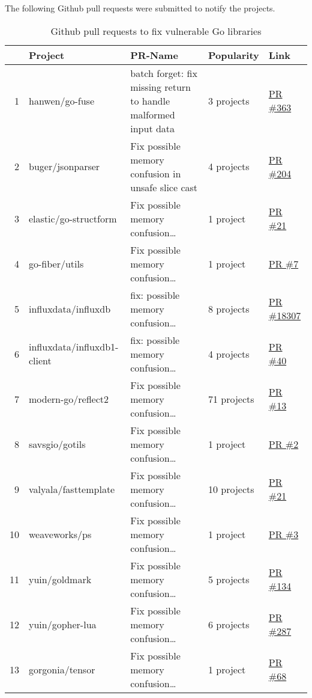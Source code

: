 The following Github pull requests were submitted to notify the projects.

\begin{table}[h]
    \centering
    \caption{Github pull requests to fix vulnerable Go libraries}
    \label{tbl:pull-requests}
    \begin{tabularx}{\textwidth}{rlXll}
        \toprule
        {} & Project & PR-Name & Popularity & Link \\
        \midrule
        1  & hanwen/go-fuse & batch forget: fix missing return to handle malformed input data & 3 projects & \href{https://www.github.com/hanwen/go-fuse/pull/363}{PR \#363} \\
        2  & buger/jsonparser & Fix possible memory confusion in unsafe slice cast & 4 projects & \href{https://www.github.com/buger/jsonparser/pull/204}{PR \#204} \\
        3  & elastic/go-structform & Fix possible memory confusion\ldots & 1 project & \href{https://github.com/elastic/go-structform/pull/21}{PR \#21} \\
        4  & go-fiber/utils & Fix possible memory confusion\ldots & 1 project & \href{https://github.com/gofiber/utils/pull/7}{PR \#7} \\
        5  & influxdata/influxdb & fix: possible memory confusion\ldots & 8 projects & \href{https://github.com/influxdata/influxdb/pull/18307}{PR \#18307} \\
        6  & influxdata/influxdb1-client & fix: possible memory confusion\ldots & 4 projects & \href{https://github.com/influxdata/influxdb1-client/pull/40}{PR \#40} \\
        7  & modern-go/reflect2 & Fix possible memory confusion\ldots & 71 projects & \href{https://github.com/modern-go/reflect2/pull/13}{PR \#13} \\
        8  & savsgio/gotils & Fix possible memory confusion\ldots & 1 project & \href{https://github.com/savsgio/gotils/pull/2}{PR \#2} \\
        9  & valyala/fasttemplate & Fix possible memory confusion\ldots & 10 projects & \href{https://github.com/valyala/fasttemplate/pull/21}{PR \#21} \\
        10 & weaveworks/ps & Fix possible memory confusion\ldots & 1 project & \href{https://github.com/weaveworks/ps/pull/3}{PR \#3} \\
        11 & yuin/goldmark & Fix possible memory confusion\ldots & 5 projects & \href{https://github.com/yuin/goldmark/pull/134}{PR \#134} \\
        12 & yuin/gopher-lua & Fix possible memory confusion\ldots & 6 projects & \href{https://github.com/yuin/gopher-lua/pull/287}{PR \#287} \\
        13 & gorgonia/tensor & Fix possible memory confusion\ldots & 1 project & \href{https://github.com/gorgonia/tensor/pull/68}{PR \#68} \\
        \bottomrule
    \end{tabularx}
\end{table}

